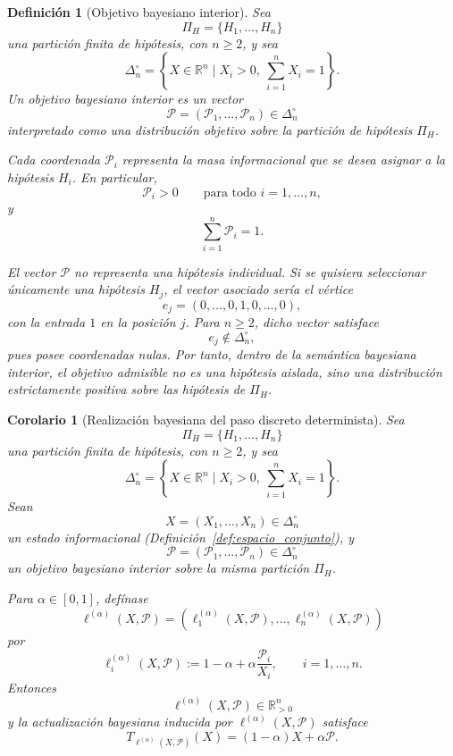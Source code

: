 ﻿\documentclass[12pt]{article}
\newtheorem{definicion}{Definición}[section]
\newtheorem{corolario}{Corolario}[section]
\begin{document}
\begin{definicion}[Objetivo bayesiano interior]
Sea
\[
\Pi_H=\{H_1,\dots,H_n\}
\]
una partición finita de hipótesis, con \(n\geq 2\), y sea
\[
\Delta_n^\circ
=
\left\{
X\in\mathbb R^n
\mid
X_i>0,\ \sum_{i=1}^n X_i=1
\right\}.
\]
Un \emph{objetivo bayesiano interior} es un vector
\[
\mathcal P=(\mathcal P_1,\dots,\mathcal P_n)\in\Delta_n^\circ
\]
interpretado como una distribución objetivo sobre la partición de hipótesis \(\Pi_H\).

Cada coordenada \(\mathcal P_i\) representa la masa informacional que se desea asignar a la hipótesis \(H_i\). En particular,
\[
\mathcal P_i>0
\qquad\text{para todo }i=1,\dots,n,
\]
y
\[
\sum_{i=1}^n \mathcal P_i=1.
\]

El vector \(\mathcal P\) no representa una hipótesis individual. Si se quisiera seleccionar únicamente una hipótesis \(H_j\), el vector asociado sería el vértice
\[
e_j=(0,\dots,0,1,0,\dots,0),
\]
con la entrada \(1\) en la posición \(j\). Para \(n\geq 2\), dicho vector satisface
\[
e_j\notin\Delta_n^\circ,
\]
pues posee coordenadas nulas. Por tanto, dentro de la semántica bayesiana interior, el objetivo admisible no es una hipótesis aislada, sino una distribución estrictamente positiva sobre las hipótesis de \(\Pi_H\).
\end{definicion}

\begin{corolario}[Realización bayesiana del paso discreto determinista]
Sea
\[
\Pi_H=\{H_1,\dots,H_n\}
\]
una partición finita de hipótesis, con \(n\geq 2\), y sea
\[
\Delta_n^\circ
=
\left\{
X\in\mathbb R^n
\mid
X_i>0,\ \sum_{i=1}^n X_i=1
\right\}.
\]
Sean
\[
X=(X_1,\dots,X_n)\in\Delta_n^\circ
\]
un estado informacional (Definición~\ref{def:espacio_conjunto}), y
\[
\mathcal P=(\mathcal P_1,\dots,\mathcal P_n)\in\Delta_n^\circ
\]
un objetivo bayesiano interior sobre la misma partición \(\Pi_H\).

Para \(\alpha\in[0,1]\), defínase
\[
\ell^{(\alpha)}(X,\mathcal P)
=
\left(
\ell^{(\alpha)}_1(X,\mathcal P),
\dots,
\ell^{(\alpha)}_n(X,\mathcal P)
\right)
\]
por
\[
\ell^{(\alpha)}_i(X,\mathcal P)
:=
1-\alpha+\alpha\frac{\mathcal P_i}{X_i},
\qquad i=1,\dots,n.
\]
Entonces
\[
\ell^{(\alpha)}(X,\mathcal P)\in\mathbb R_{>0}^n
\]
y la actualización bayesiana inducida por \(\ell^{(\alpha)}(X,\mathcal P)\) satisface
\[
T_{\ell^{(\alpha)}(X,\mathcal P)}(X)
=
(1-\alpha)X+\alpha \mathcal P.
\]
\end{corolario}
\end{document}
